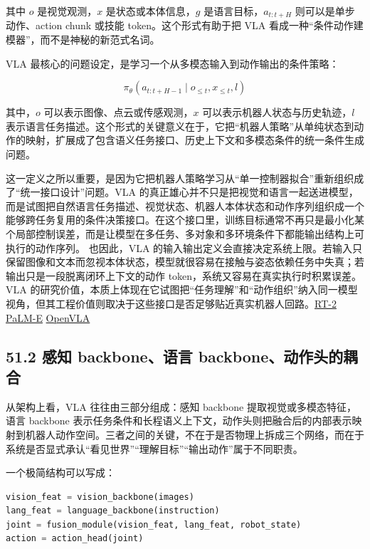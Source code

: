 其中 \(o\) 是视觉观测，\(x\) 是状态或本体信息，\(g\) 是语言目标，\(a_{t:t+H}\) 则可以是单步动作、action chunk 或技能 token。这个形式有助于把 VLA 看成一种“条件动作建模器”，而不是神秘的新范式名词。

VLA 最核心的问题设定，是学习一个从多模态输入到动作输出的条件策略：

\begin{equation*}
\pi_\theta(a_{t:t+H-1}\mid o_{\le t}, x_{\le t}, l)
\end{equation*}

其中，\(o\) 可以表示图像、点云或传感观测，\(x\) 可以表示机器人状态与历史轨迹，\(l\) 表示语言任务描述。这个形式的关键意义在于，它把“机器人策略”从单纯状态到动作的映射，扩展成了包含语义任务接口、历史上下文和多模态条件的统一条件生成问题。

这一定义之所以重要，是因为它把机器人策略学习从“单一控制器拟合”重新组织成了“统一接口设计”问题。VLA 的真正雄心并不只是把视觉和语言一起送进模型，而是试图把自然语言任务描述、视觉状态、机器人本体状态和动作序列组织成一个能够跨任务复用的条件决策接口。在这个接口里，训练目标通常不再只是最小化某个局部控制误差，而是让模型在多任务、多对象和多环境条件下都能输出结构上可执行的动作序列。 也因此，VLA 的输入输出定义会直接决定系统上限。若输入只保留图像和文本而忽视本体状态，模型就很容易在接触与姿态依赖任务中失真；若输出只是一段脱离闭环上下文的动作 token，系统又容易在真实执行时积累误差。VLA 的研究价值，本质上体现在它试图把“任务理解”和“动作组织”纳入同一模型视角，但其工程价值则取决于这些接口是否足够贴近真实机器人回路。\href{https://arxiv.org/abs/2307.15818}{RT-2} \href{https://arxiv.org/abs/2303.03378}{PaLM-E} \href{https://arxiv.org/abs/2406.09246}{OpenVLA}

\subsection*{51.2 感知 backbone、语言 backbone、动作头的耦合}


从架构上看，VLA 往往由三部分组成：感知 backbone 提取视觉或多模态特征，语言 backbone 表示任务条件和长程语义上下文，动作头则把融合后的内部表示映射到机器人动作空间。三者之间的关键，不在于是否物理上拆成三个网络，而在于系统是否显式承认“看见世界”“理解目标”“输出动作”属于不同职责。

一个极简结构可以写成：

\begin{lstlisting}[language=python]
vision_feat = vision_backbone(images)
lang_feat = language_backbone(instruction)
joint = fusion_module(vision_feat, lang_feat, robot_state)
action = action_head(joint)
\end{lstlisting}

